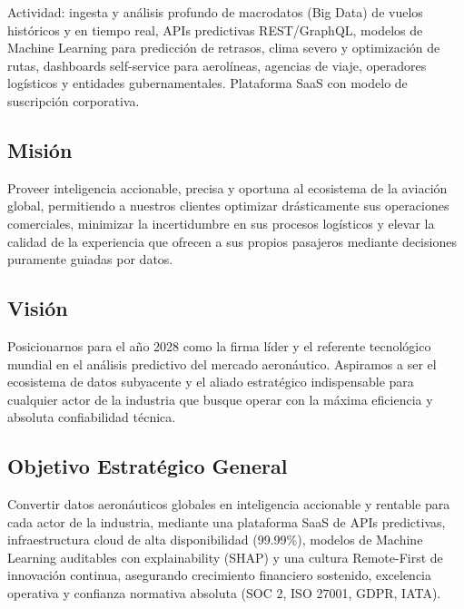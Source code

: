 ﻿\documentclass[11pt, letterpaper]{article}
\begin{document}
Actividad: ingesta y análisis profundo de macrodatos (Big Data) de vuelos históricos y en tiempo real, APIs predictivas REST/GraphQL, modelos de Machine Learning para predicción de retrasos, clima severo y optimización de rutas, dashboards self-service para aerolíneas, agencias de viaje, operadores logísticos y entidades gubernamentales. Plataforma SaaS con modelo de suscripción corporativa.





\subsection{Misión}



Proveer inteligencia accionable, precisa y oportuna al ecosistema de la aviación global, permitiendo a nuestros clientes optimizar drásticamente sus operaciones comerciales, minimizar la incertidumbre en sus procesos logísticos y elevar la calidad de la experiencia que ofrecen a sus propios pasajeros mediante decisiones puramente guiadas por datos.



\subsection{Visión}



Posicionarnos para el año 2028 como la firma líder y el referente tecnológico mundial en el análisis predictivo del mercado aeronáutico. Aspiramos a ser el ecosistema de datos subyacente y el aliado estratégico indispensable para cualquier actor de la industria que busque operar con la máxima eficiencia y absoluta confiabilidad técnica.



\subsection{Objetivo Estratégico General}



Convertir datos aeronáuticos globales en inteligencia accionable y rentable para cada actor de la industria, mediante una plataforma SaaS de APIs predictivas, infraestructura cloud de alta disponibilidad (99.99\%), modelos de Machine Learning auditables con explainability (SHAP) y una cultura Remote-First de innovación continua, asegurando crecimiento financiero sostenido, excelencia operativa y confianza normativa absoluta (SOC 2, ISO 27001, GDPR, IATA).
\end{document}
